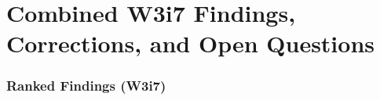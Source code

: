 \documentclass[11pt]{article}
\theoremstyle{definition}
\theoremstyle{remark}
\begin{document}
\part{Combined W3i7 Findings, Corrections, and Open Questions}
\label{part:combined}

\section{Ranked Findings (W3i7)}
\label{sec:ranked_findings}
\end{document}
